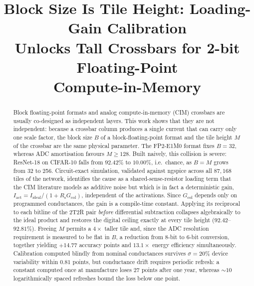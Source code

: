 \documentclass[conference,10pt]{IEEEtran}
\newcommand{\Rs}{R_{\mathrm{s}}}
\newcommand{\Gcol}{G_{\mathrm{col}}}
\begin{document}
\title{Block Size Is Tile Height: Loading-Gain Calibration\\
Unlocks Tall Crossbars for 2-bit Floating-Point\\
Compute-in-Memory}

\author{
}

\maketitle

\begin{abstract}
Block floating-point formats and analog compute-in-memory (CIM) crossbars are
usually co-designed as independent layers. This work shows that they are not
independent: because a crossbar column produces a single current that can carry
only one scale factor, the block size $B$ of a block-floating-point format and
the tile height $M$ of the crossbar are the same physical parameter. The FP2-E1M0
format fixes $B{=}32$, whereas ADC amortisation favours $M{\geq}128$. Built
naively, this collision is severe: ResNet-18 on CIFAR-10 falls from
$92.42\%$ to $10.00\%$, i.e.\ chance, as $B{=}M$ grows from 32 to 256.
Circuit-exact simulation, validated against ngspice across all $87{,}168$ tiles
of the network, identifies the cause as a shared-sense-resistor loading term
that the CIM literature models as additive noise but which is in fact a
deterministic gain, $I_{\mathrm{act}}{=}I_{\mathrm{ideal}}/(1{+}\Rs \Gcol)$,
independent of the activations. Since $\Gcol$ depends only on programmed
conductances, the gain is a compile-time constant. Applying its reciprocal to
each bitline of the 2T2R pair \emph{before} differential subtraction collapses
algebraically to the ideal product and restores the digital ceiling exactly at
every tile height ($92.42$--$92.81\%$). Freeing $M$ permits a $4\times$ taller
tile and, since the ADC resolution requirement is measured to be flat in $B$, a
reduction from 8-bit to 6-bit conversion, together yielding $+14.77$ accuracy
points and $13.1\times$ energy efficiency simultaneously. Calibration computed
blindly from nominal conductances survives $\sigma{=}20\%$ device variability
within $0.81$ points, but conductance drift requires periodic refresh: a
constant computed once at manufacture loses $27$ points after one year, whereas
$\sim\!10$ logarithmically spaced refreshes bound the loss below one point.
\end{abstract}
\end{document}
